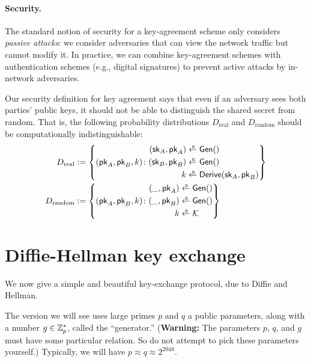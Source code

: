 \paragraph{Security.}
The standard notion of security for a key-agreement scheme
only considers \emph{passive attacks}:
we consider adversaries that can view the
network traffic but cannot modify it.
In practice, we can combine key-agreement
schemes with authentication schemes (e.g., digital signatures)
to prevent active attacks by in-network adversaries.

Our security definition for key agreement says that even
if an adversary sees both parties' public keys, it should
not be able to distinguish the shared secret from random.
That is, the following probability distributions
$D_\text{real}$ and $D_\text{random}$ should be 
computationally indistinguishable:
\begin{align*}
  D_\text{real} &\deq \left\{ 
(\pk_A, \pk_B, k) \colon  \begin{aligned}
  (\sk_A, \pk_A) &\getsr \Gen()\\
  (\sk_B, \pk_B) &\getsr \Gen()\\
  k &\getsr \Derive(\sk_A, \pk_B)
\end{aligned}
\right\} \\
  D_\text{random} &\deq \left\{ (\pk_A, \pk_B, k) \colon  \begin{aligned}
  (\_, \pk_A) &\getsr \Gen()\\
  (\_, \pk_B) &\getsr \Gen()\\
  k &\getsr \calK 
\end{aligned}
  \right\}
\end{align*}


\section{Diffie-Hellman key exchange}
We now give a simple and beautiful key-exchange protocol, 
due to Diffie and Hellman.

The version we will see uses large primes $p$ 
and $q$ a public parameters, along with a number $g \in \mathbb{Z}^*_p$,
called the ``generator.''
(\textbf{Warning:} The parameters $p$, $q$, and $g$ must have
some particular relation. So do not attempt to pick these parameters
yourself.)
Typically, we will have $p \approx q \approx 2^{2048}$.

